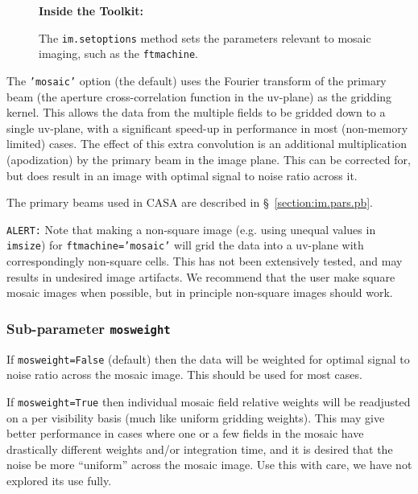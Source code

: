 \begin{wrapfigure}{r}{2.5in}
  \begin{boxedminipage}{2.5in}
     \centerline{\bf Inside the Toolkit:}
     The {\tt im.setoptions} method sets the parameters relevant to
     mosaic imaging, such as the {\tt ftmachine}.
  \end{boxedminipage}
\end{wrapfigure}

The {\tt 'mosaic'} option (the default) uses the Fourier transform of the
primary beam (the aperture cross-correlation function in the uv-plane) as
the gridding kernel.  This allows the data from the multiple fields to be
gridded down to a single uv-plane, with a significant speed-up in 
performance in most (non-memory limited) cases.  The effect of this extra
convolution is an additional multiplication (apodization) by the primary
beam in the image plane.  This can be corrected for, but does result in
an image with optimal signal to noise ratio across it.

The primary beams used in CASA are described in \S~\ref{section:im.pars.pb}.

{\tt ALERT:} Note that making a non-square image (e.g. using
unequal values in {\tt imsize}) for {\tt ftmachine='mosaic'} will grid 
the data into a uv-plane with correspondingly non-square cells.  This
has not been extensively tested, and may results in undesired image
artifacts.  We recommend that the user make square mosaic images when
possible, but in principle non-square images should work.

\subsubsection{Sub-parameter {\tt mosweight} }
\label{section:im.imagermode.mosaic.mosweight}

If {\tt mosweight=False} (default) then the data will be
weighted for optimal signal to noise ratio across the mosaic image. 
This should be used for most cases.

If {\tt mosweight=True} then individual mosaic field relative weights
will be readjusted on a per visibility basis (much like uniform
gridding weights).  This may give better performance in cases where
one or a few fields in the mosaic have drastically different weights
and/or integration time, and it is desired that the noise be more
``uniform'' across the mosaic image.  Use this with care, we have
not explored its use fully.

